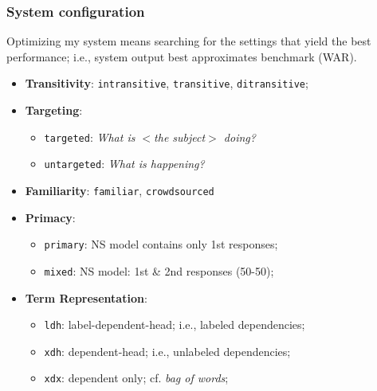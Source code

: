 \documentclass[handout,xcolor={dvipsnames}]{beamer}
\newcommand{\param}[1]{\texttt{#1}}
\begin{document}
\begin{frame}
\frametitle{System configuration}
\small

Optimizing my system means searching for the settings that yield the best performance;
i.e., system output best approximates benchmark (WAR). \\

\begin{itemize}
\pause
\item \textbf{Transitivity}: \param{intransitive}, \param{transitive}, \param{ditransitive};
\pause
\item \textbf{Targeting}: 
\begin{itemize}
\item \param{targeted}: \textit{What is $<$the subject$>$ doing?}
\item \param{untargeted}: \textit{What is happening?}
\end{itemize}
\pause
\item \textbf{Familiarity}: \param{familiar}, \param{crowdsourced}
\pause
\item \textbf{Primacy}:
\begin{itemize}
\item \param{primary}: NS model contains only 1st responses;
\item \param{mixed}: NS model: 1st \& 2nd responses (50-50);
\end{itemize}
\pause
\item \textbf{Term Representation}:
\begin{itemize}
\item \param{ldh}: label-dependent-head; i.e., labeled dependencies;
\item \param{xdh}: dependent-head; i.e., unlabeled dependencies;
\item \param{xdx}: dependent only; cf. \textit{bag of words};
\end{itemize}
\end{itemize}
\end{frame}
\end{document}
